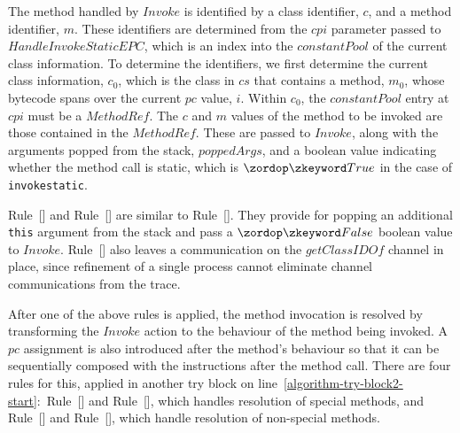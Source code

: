 The method handled by $Invoke$ is identified by a class identifier,
$c$, and a method identifier, $m$.
These identifiers are determined from the $cpi$ parameter passed to
$HandleInvokeStaticEPC$, which is an index into the $constantPool$ of
the current class information.
To determine the identifiers, we first determine the current class
information, $c_0$, which is the class in $cs$ that contains a method,
$m_0$, whose bytecode spans over the current $pc$ value, $i$.
Within $c_0$, the $constantPool$ entry at $cpi$ must be a $MethodRef$.
The $c$ and $m$ values of the method to be invoked are those contained
in the $MethodRef$.
These are passed to $Invoke$, along with the arguments popped from the
stack, $poppedArgs$, and a boolean value indicating whether the method
call is static, which is $\true$ in the case of \texttt{invokestatic}.

Rule~[] and
Rule~[] are similar to
Rule~[].
They provide for popping an additional \texttt{this} argument from the
stack and pass a $\false$ boolean value to $Invoke$.
Rule~[] also leaves a
communication on the $getClassIDOf$ channel in place, since refinement
of a single process cannot eliminate channel communications from the
trace.

After one of the above rules is applied, the method invocation is
resolved by transforming the $Invoke$ action to the behaviour of the
method being invoked.
A $pc$ assignment is also introduced after the method's behaviour so
that it can be sequentially composed with the instructions after the
method call.
There are four rules for this, applied in another try block on
line~\ref{algorithm-try-block2-start}:~Rule~[]
and Rule~[], which
handles resolution of special methods, and
Rule~[] and
Rule~[], which handle
resolution of non-special methods.

